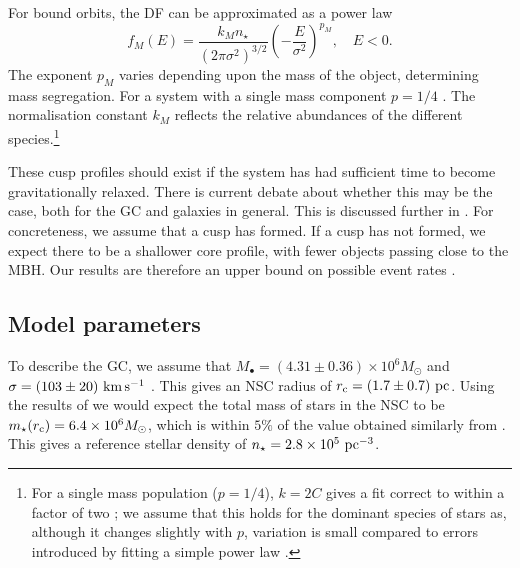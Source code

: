 For bound orbits, the DF can be approximated as a power law \citep{Peebles1972}
\begin{equation}
f_M(E) = \dfrac{k_M n_\star}{(2\pi\sigma^2)^{3/2}}\left(-\dfrac{E}{\sigma^2}\right)^{p_M},\quad E < 0.
\label{eq:Bound_DF}
\end{equation}
The exponent $p_M$ varies depending upon the mass of the object, determining mass segregation. For a system with a single mass component $p = 1/4$ \citep{Bahcall1976, Young1977}. The normalisation constant $k_M$ reflects the relative abundances of the different species.\footnote{For a single mass population ($p = 1/4$), $k = 2 C$ gives a fit correct to within a factor of two \citep{Bahcall1976,Keshet2009}; we assume that this holds for the dominant species of stars as, although it changes slightly with $p$, variation is small compared to errors introduced by fitting a simple power law \citep{Hopman2006, Alexander2009}.}

These cusp profiles should exist if the system has had sufficient time to become gravitationally relaxed. There is current debate about whether this may be the case, both for the GC and galaxies in general. This is discussed further in . For concreteness, we assume that a cusp has formed. If a cusp has not formed, we expect there to be a shallower core profile, with fewer objects passing close to the MBH. Our results are therefore an upper bound on possible event rates \citep{Merritt2010a,Antonini2011,Gualandris2012}. 

\subsection{Model parameters}\label{sec:GC-Param}

To describe the GC, we assume that $M_\bullet = (4.31 \pm 0.36) \times 10^6 M_\odot$ \citep{Gillessen2009} and $\sigma = (103 \pm 20)~\mathrm{km\,s^{-1}}$ \citep{Tremaine2002}. This gives an NSC radius of $r_\mathrm{c} = (1.7 \pm 0.7)~\mathrm{pc}$. Using the results of \citet{Ghez2008} we would expect the total mass of stars in the NSC to be $m_\star(r_\mathrm{c}) = 6.4 \times 10^6 M_\odot$, which is within $5\%$ of the value obtained similarly from \citet{Genzel2003}. This gives a reference stellar density of $n_\star = 2.8 \times 10^5~\mathrm{pc^{-3}}$.

